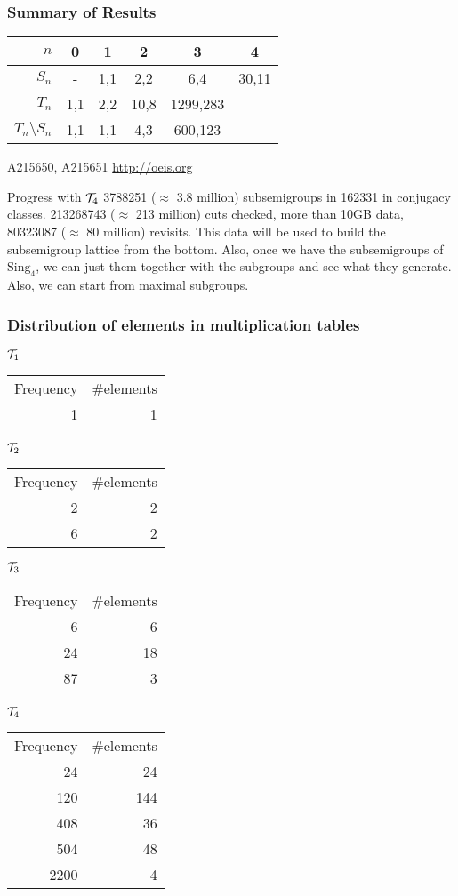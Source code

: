 \documentclass{beamer}
\newcommand{\cT}{{\cal T}}
\newcommand{\jump}{\vskip6pt}
\begin{document}
\begin{frame}\frametitle{Summary of Results}
\begin{center}

\begin{tabular}{|r|c|c|c|c|c|}
\hline
$n$ & 0 & 1 & 2 & 3 & 4 \\
\hline
$S_n$ & - & 1,1 & 2,2 & 6,4 & 30,11\\
\hline
$T_n$ &1,1 & 2,2 & 10,8 & 1299,283 & \\
\hline
$T_n\setminus S_n$ & 1,1 & 1,1 & 4,3 & 600,123& \\
\hline
\end{tabular}
\end{center}
A215650, A215651 \url{http://oeis.org}
\end{frame}

\begin{frame}{Progress with $\cT_4$}
3788251 ($\approx$ 3.8 million) subsemigroups in 162331 in conjugacy classes.
\jump
213268743 ($\approx$ 213 million) cuts checked, more than 10GB data,  80323087 ($\approx$ 80 million) revisits.
\jump
\jump
This data will be used to build the subsemigroup lattice from the bottom.
\jump
Also, once we have the subsemigroups of $\text{Sing}_4$, we can just them together with the subgroups and see what they generate.
\jump
Also, we can start from maximal subgroups.

\end{frame}

\begin{frame}
\frametitle{Distribution of elements in multiplication tables}
$\cT_{1}$
\begin{tabular}{r|r}
Frequency & \#elements\\
1 & 1\\
\end{tabular}
\jump
$\cT_{2}$
\begin{tabular}{r|r}
Frequency & \#elements\\
2 & 2\\
6 & 2\\
\end{tabular}
\jump
$\cT_{3}$
\begin{tabular}{r|r}
Frequency & \#elements\\
6 & 6\\
24 & 18\\
87 & 3\\
\end{tabular}
\jump
$\cT_{4}$
\begin{tabular}{r|r}
Frequency & \#elements\\
24 & 24\\
120 & 144\\
408 & 36\\
504 & 48\\
2200 & 4\\
\end{tabular}


\end{frame}
\end{document}

